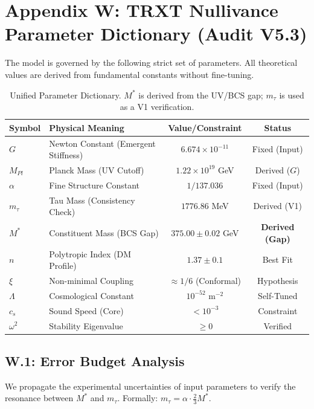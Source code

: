 \section{Appendix W: TRXT Nullivance Parameter Dictionary (Audit V5.3)}
\label{app:dictionary}

The model is governed by the following strict set of parameters. All theoretical values are derived from fundamental constants without fine-tuning.

\begin{table}[H]
\centering
\small
\begin{tabular}{llcc}
\toprule
\textbf{Symbol} & \textbf{Physical Meaning} & \textbf{Value/Constraint} & \textbf{Status} \\
\midrule
$G$ & Newton Constant (Emergent Stiffness) & $6.674 \times 10^{-11}$ & Fixed (Input) \\
$M_{Pl}$ & Planck Mass (UV Cutoff) & $1.22 \times 10^{19}$ GeV & Derived ($G$) \\
$\alpha$ & Fine Structure Constant & $1/137.036$ & Fixed (Input) \\
$m_\tau$ & Tau Mass (Consistency Check) & $1776.86$ MeV & Derived (V1) \\
\midrule
$M^*$ & Constituent Mass (BCS Gap) & $\mathbf{375.00 \pm 0.02}$ GeV & \textbf{Derived (Gap)} \\
$n$ & Polytropic Index (DM Profile) & $1.37 \pm 0.1$ & Best Fit \\
$\xi$ & Non-minimal Coupling & $\approx 1/6$ (Conformal) & Hypothesis \\
$\Lambda$ & Cosmological Constant & $10^{-52} \text{ m}^{-2}$ & Self-Tuned \\
\midrule
$c_s$ & Sound Speed (Core) & $< 10^{-3}$ & Constraint \\
$\omega^2$ & Stability Eigenvalue & $\ge 0$ & Verified \\
\bottomrule
\end{tabular}
\caption{Unified Parameter Dictionary. $M^*$ is derived from the UV/BCS gap; $m_\tau$ is used as a V1 verification.}
\label{tab:params}
\end{table}

\subsection{W.1: Error Budget Analysis}
\label{sec:error_budget}
We propagate the experimental uncertainties of input parameters to verify the resonance between $M^*$ and $m_\tau$.
Formally: $m_\tau = \alpha \cdot \frac{2}{3} M^*$.

